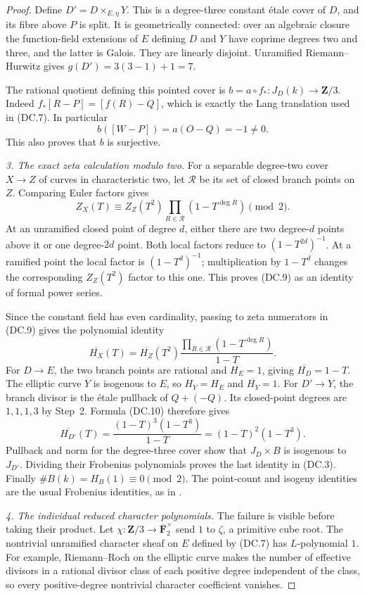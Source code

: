 \documentclass[11pt,a4paper]{article}
\begin{document}
\begin{proof}
Define $D'=D\times_{E,\eta}Y$.  This is a degree-three
constant \'etale cover of $D$, and its fibre above $P$ is
split.  It is geometrically connected: over an algebraic
closure the function-field extensions of $E$ defining $D$
and $Y$ have coprime degrees two and three, and the latter
is Galois.  They are linearly disjoint.
Unramified Riemann--Hurwitz gives $g(D')=3(3-1)+1=7$.

The rational quotient defining this pointed cover is
$b=a\circ f_*:J_D(k)\to\mathbf Z/3$.
Indeed $f_*[R-P]=[f(R)-Q]$, which is exactly the Lang
translation used in (DC.7).  In particular
\[
                 b([W-P])=a(O-Q)=-1\ne0.
\tag{DC.8}
\]
This also proves that $b$ is surjective.

\emph{3. The exact zeta calculation modulo two.}
For a separable degree-two cover $X\to Z$ of curves in
characteristic two, let $\mathcal R$ be its set of closed
branch points on $Z$.  Comparing Euler factors gives
\[
 Z_X(T)\equiv Z_Z(T^2)
                   \prod_{R\in\mathcal R}(1-T^{\deg R})
                                \pmod2.
\tag{DC.9}
\]
At an unramified closed point of degree $d$, either there
are two degree-$d$ points above it or one degree-$2d$ point.
Both local factors reduce to $(1-T^{2d})^{-1}$.
At a ramified point the local factor is $(1-T^d)^{-1}$;
multiplication by $1-T^d$ changes the corresponding
$Z_Z(T^2)$ factor to this one.  This proves (DC.9) as an
identity of formal power series.

Since the constant field has even cardinality, passing to
zeta numerators in (DC.9) gives the polynomial identity
\[
 \overline{H_X}(T)=\overline{H_Z}(T^2)
             \frac{\prod_{R\in\mathcal R}(1-T^{\deg R})}{1-T}.
\tag{DC.10}
\]
For $D\to E$, the two branch points are rational and
$\overline{H_E}=1$, giving $\overline{H_D}=1-T$.
The elliptic curve $Y$ is isogenous to $E$, so
$H_Y=H_E$ and $\overline{H_Y}=1$.
For $D'\to Y$, the branch divisor is the \'etale pullback
of $Q+(-Q)$.  Its closed-point degrees are $1,1,1,3$ by
Step~2.  Formula (DC.10) therefore gives
\[
       \overline{H_{D'}}(T)
              =\frac{(1-T)^3(1-T^3)}{1-T}
              =(1-T)^2(1-T^3).
\]
Pullback and norm for the degree-three cover show that
$J_D\times B$ is isogenous to $J_{D'}$.  Dividing their
Frobenius polynomials proves the last identity in (DC.3).
Finally
$\#B(k)=H_B(1)\equiv0\pmod2$.
The point-count and isogeny identities are the usual
Frobenius identities, as in
\cite[Theorem~19.1(b) and its Frobenius proof, pp.~40--41]{MilneAV}.

\emph{4. The individual reduced character polynomials.}
The failure is visible before taking their product.
Let $\chi:\mathbf Z/3\to\overline{\mathbf F}_2^\times$
send $1$ to $\zeta$, a primitive cube root.
The nontrivial unramified character sheaf on $E$ defined
by (DC.7) has $L$-polynomial $1$.
For example, Riemann--Roch on the elliptic curve makes
the number of effective divisors in a rational divisor
class of each positive degree independent of the class,
so every positive-degree nontrivial character coefficient
vanishes.


\end{proof}
\end{document}
